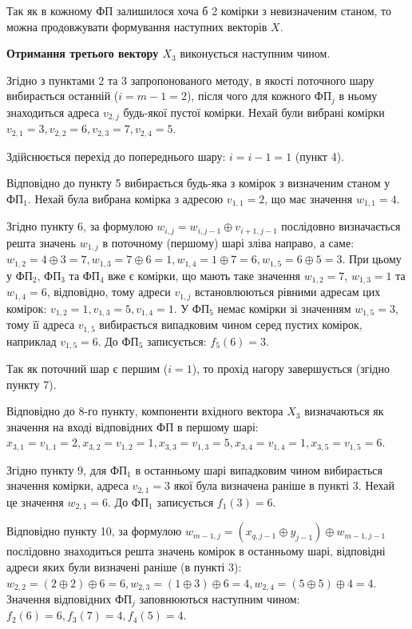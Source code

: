 \documentclass[12pt]{article}
\begin{document}
Так як в кожному ФП залишилося хоча б 2 комірки з невизначеним станом, то можна продовжувати формування наступних векторів $X$.

\textbf{Отримання третього вектору $X_3$} виконується наступним чином.

Згідно з пунктами 2 та 3 запропонованого методу, в якості поточного шару вибирається останній ($i = m - 1 = 2$), після чого для кожного ФП$_j$ в ньому знаходиться адреса $v_{2, j}$ будь-якої пустої комірки. Нехай були вибрані комірки $v_{2,1}=3, v_{2,2}=6, v_{2,3}=7, v_{2,4}=5$.

Здійснюється перехід до попереднього шару: $i = i - 1 = 1$ (пункт 4).

Відповідно до пункту 5 вибирається будь-яка з комірок з визначеним станом у ФП$_1$.
Нехай була вибрана комірка з адресою $v_{1,1}=2$, що має значення $w_{1,1}=4$.

Згідно пункту 6, за формулою $w_{i,j} = w_{i,j-1} \oplus v_{i+1,j-1}$ послідовно визначається решта значень $w_{1,j}$ в поточному (першому) шарі зліва направо, а саме: $w_{1,2} = 4 \oplus 3 = 7, w_{1,3} = 7 \oplus 6 = 1, w_{1,4} = 1 \oplus 7 = 6, w_{1,5} = 6 \oplus 5 = 3$.
При цьому у ФП$_2$, ФП$_3$ та ФП$_4$ вже є комірки, що мають таке значення $w_{1,2}=7$, $w_{1,3}=1$ та $w_{1,4}=6$, відповідно, тому адреси $v_{1,j}$ встановлюються рівними адресам цих комірок: $v_{1,2} = 1, v_{1,3} = 5, v_{1,4} = 1$. У ФП$_5$ немає комірки зі значенням $w_{1,5}=3$, тому її адреса $v_{1,5}$ вибирається випадковим чином серед пустих комірок, наприклад $v_{1,5}=6$. До ФП$_5$ записується: $f_5(6)=3$.

Так як поточний шар є першим ($i=1$), то прохід нагору завершується (згідно пункту 7).

Відповідно до 8-го пункту, компоненти вхідного вектора $X_3$ визначаються як значення на вході відповідних ФП в першому шарі: $x_{3,1}=v_{1,1}=2, x_{3,2}=v_{1,2}=1, x_{3,3}=v_{1,3}=5, x_{3,4}=v_{1,4}=1, x_{3,5}=v_{1,5}=6$.

Згідно пункту 9, для ФП$_1$ в останньому шарі випадковим чином вибирається значення комірки, адреса $v_{2,1}=3$ якої  була визначена раніше в пункті 3. Нехай це значення $w_{2,1}=6$. До ФП$_1$ записується $f_1(3)=6$.

Відповідно пункту 10, за формулою $w_{m-1,j}=(x_{q,j-1} \oplus y_{j-1}) \oplus w_{m-1,j-1}$ послідовно знаходиться решта значень комірок в останньому шарі, відповідні адреси яких були визначені раніше (в пункті 3): $w_{2,2} = (2 \oplus 2) \oplus 6 = 6, w_{2,3} = (1 \oplus 3) \oplus 6 = 4, w_{2,4} = (5 \oplus 5) \oplus 4 = 4$. Значення відповідних ФП$_j$ заповнюються наступним чином: $f_2(6)=6, f_3(7)=4, f_4(5)=4$.
\end{document}
